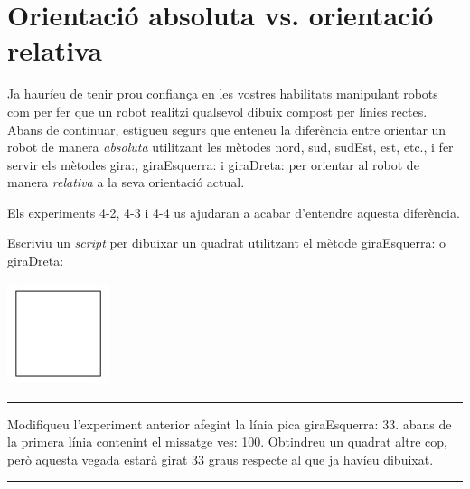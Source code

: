 \section{Orientació absoluta vs. orientació relativa}
Ja hauríeu de tenir prou confiança en les vostres habilitats manipulant robots com per fer que un robot realitzi qualsevol dibuix compost per línies rectes. Abans de continuar, estigueu segurs que enteneu la diferència entre orientar un robot de manera \emph{absoluta} utilitzant les mètodes \textsf{nord}, \textsf{sud}, \textsf{sudEst}, \textsf{est}, etc., i fer servir els mètodes \textsf{gira:}, \textsf{giraEsquerra:} i \textsf{giraDreta:} per orientar al robot de manera \emph{relativa} a la seva orientació actual.  

\noindent
Els experiments 4-2, 4-3 i 4-4 us ajudaran a acabar d'entendre aquesta diferència.

\begin{center}
\colorbox{black}{}
\end{center}
{\small
\noindent
Escriviu un \emph{script} per dibuixar un quadrat utilitzant el mètode \textsf{giraEsquerra:} o \textsf{giraDreta:}  }
\begin{center}
\includegraphics[height=30mm ,width=30mm]{Imatges/figuraE4-2.jpg}
\end{center}
\noindent
\rule{\textwidth}{3pt}

\begin{center}
\colorbox{black}{}
\end{center}
{\small
\noindent
Modifiqueu l'experiment anterior afegint la línia \textsf{pica giraEsquerra: 33.} abans de la primera línia contenint el missatge \textsf{ves: 100}. Obtindreu un quadrat altre cop, però aquesta vegada estarà girat 33 graus respecte al que ja havíeu dibuixat.}\\
\noindent
\rule{\textwidth}{3pt}

